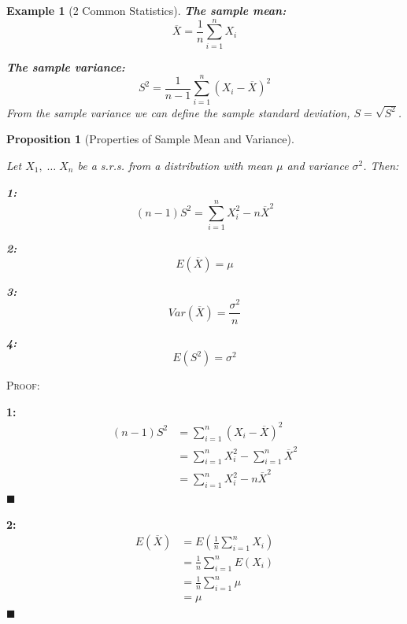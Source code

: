 \documentclass[12pt,a4paper]{article}
\newtheorem{ex}[thm]{Example}
\newtheorem{prop}[thm]{Proposition}
\begin{document}
\begin{ex}[2 Common Statistics]\vspace{1cm}

\noindent\textbf{The sample mean:}
$$\overline{X} = \frac{1}{n} \sum_{i=1}^n X_i$$

\noindent\textbf{The sample variance:}
$$S^2 = \frac{1}{n-1}\sum_{i=1}^n (X_i - \overline{X})^2$$
From the sample variance we can define the sample standard deviation, $S=\sqrt{S^2}$.

\end{ex}

\begin{prop}[Properties of Sample Mean and Variance]\label{sample moments}\vspace{1cm}

Let $X_1,\;\hdots\; X_n$ be a s.r.s. from a distribution with mean $\mu$ and variance $\sigma^2$. Then:

\textbf{1: }
$$(n-1)S^2 = \sum_{i=1}^n X_i^2 - n\overline{X}^2$$

\textbf{2:}
$$E(\overline{X}) = \mu$$

\textbf{3:}
$$Var(\overline{X}) = \frac{\sigma^2}{n}$$

\textbf{4:}
$$E(S^2) = \sigma^2$$

\end{prop}

\noindent\textsc{Proof:}\par\vspace{1cm}

\textbf{1: }
\begin{align*}
(n-1)S^2 &= \sum_{i=1}^n (X_i-\overline{X})^2\\
&= \sum_{i=1}^n X_i^2 - \sum_{i=1}^n \overline{X}^2\\
&= \sum_{i=1}^n X_i^2 - n\overline{X}^2
\end{align*}\hfill$\blacksquare$

\textbf{2:}
\begin{align*}
E(\overline{X}) &= E(\frac{1}{n}\sum_{i=1}^n X_i)\\
&= \frac{1}{n}\sum_{i=1}^n E(X_i)\\
&= \frac{1}{n} \sum_{i=1}^n \mu\\
&= \mu
\end{align*}\hfill$\blacksquare$
\end{document}
